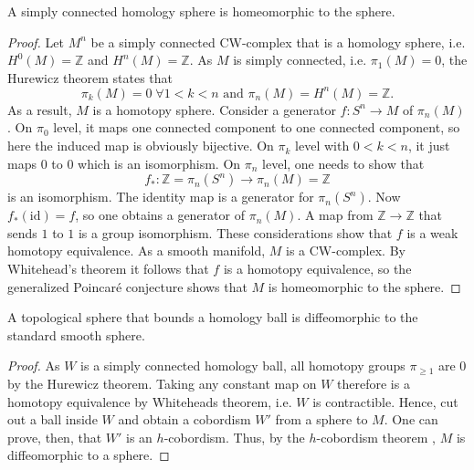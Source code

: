 \begin{lemma}
    A simply connected homology sphere is homeomorphic to the sphere.
\end{lemma}
\begin{proof}
    Let $M^n$ be a simply connected CW-complex that is a homology sphere, i.e. $H^0(M) = \mathbb Z$ and $H^n(M) = \mathbb Z$. 
    As $M$ is simply connected, i.e. $\pi_1(M) = 0$, the Hurewicz theorem states that
    \[
    \pi_k(M) = 0 \; \forall 1 < k < n\text{ and }\pi_n(M) = H^n(M) = \mathbb Z.
    \]
    As a result, $M$ is a homotopy sphere.
    Consider a generator $f: S^n \to M$ of $\pi_n(M)$.
    On $\pi_0$ level, it maps one connected component to one connected component, so here the induced map is obviously bijective.
    On $\pi_k$ level with $0 < k < n$, it just maps $0$ to $0$ which is an isomorphism.
    On $\pi_n$ level, one needs to show that 
    \[
        f_*: \mathbb Z = \pi_n(S^n) \to \pi_n(M) = \mathbb Z 
    \]
    is an isomorphism. The identity map is a generator for $\pi_n(S^n)$. Now $f_*(\mathrm{id}) = f$, so one obtains a generator of $\pi_n(M)$. 
    A map from $\mathbb Z \to \mathbb Z$ that sends $1$ to $1$ is a group isomorphism. These considerations show that $f$ is a weak homotopy equivalence.
    As a smooth manifold, $M$ is a CW-complex. By Whitehead's theorem it follows that $f$ is a homotopy equivalence, so the generalized Poincar\'e conjecture 
    shows that $M$ is homeomorphic to the sphere.
\end{proof}

\begin{lemma}
    A topological sphere that bounds a homology ball is diffeomorphic to the standard smooth sphere.
\end{lemma}
\begin{proof}
    As $W$ is a simply connected homology ball, all homotopy groups $\pi_{\ge 1}$ are 0 by the Hurewicz theorem.
    Taking any constant map on $W$ therefore is a homotopy equivalence by Whiteheads theorem, i.e. $W$ is contractible. 
    Hence, cut out a ball inside $W$ and obtain a cobordism $W'$ from a sphere to $M$.
    One can prove, then, that $W'$ is an $h$-cobordism.
    Thus, by the $h$-cobordism theorem \cite[Theorem 1.9]{Ranicki02}, $M$ is diffeomorphic to a sphere.
\end{proof}